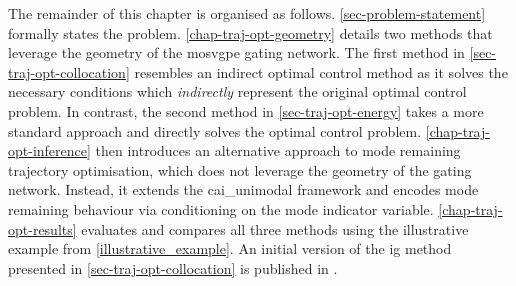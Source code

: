 \documentclass{mimosis-class/mimosis}
\numberwithin{equation}{chapter}
\begin{document}
{The remainder of this chapter is organised as follows.
\cref{sec-problem-statement} formally states the problem.
\cref{chap-traj-opt-geometry} details two methods that leverage the geometry of the \acrshort{mosvgpe} gating network.
The first method in \cref{sec-traj-opt-collocation}
resembles an indirect optimal control method as it solves the necessary conditions which \emph{indirectly} represent the
original optimal control problem.
In contrast, the second method in \cref{sec-traj-opt-energy} takes a more standard approach and directly solves the
optimal control problem.
\cref{chap-traj-opt-inference} then introduces an alternative approach to mode remaining trajectory optimisation, which
does not leverage the geometry of the gating network.
Instead, it extends the \acrfull{cai_unimodal} framework \citep{toussaintRobot2009} and encodes mode remaining behaviour via conditioning on
the mode indicator variable.
\cref{chap-traj-opt-results} evaluates and compares all three methods using the illustrative
example from \cref{illustrative_example}.
An initial version of the \acrfull{ig} method presented in \cref{sec-traj-opt-collocation}
is published in \cite{scannellTrajectory2021}.
}
\end{document}
